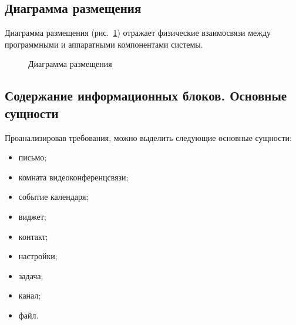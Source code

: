\subsection{Диаграмма размещения}

Диаграмма размещения (рис.~\ref{place:image}) отражает физические взаимосвязи между программными и аппаратными компонентами системы.

\vspace{-8mm} %
\begin{figure}[H]
\caption{Диаграмма размещения}
\label{place:image}
\end{figure}

\subsection{Содержание информационных блоков. Основные сущности}

Проанализировав требования, можно выделить следующие основные сущности:
\begin{itemize}
  \item письмо;
  \item комната видеоконференцсвязи;
  \item событие календаря;
  \item виджет;
  \item контакт;
  \item настройки;
  \item задача;
  \item канал;
  \item файл.
\end{itemize}

